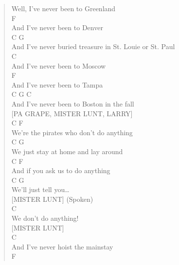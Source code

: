 \documentclass[11pt]{article}
\begin{document}
\begin{verse}
Well, I've never been to Greenland\\
\hspace*{9em}F\\
And I've never been to Denver\\
\hspace*{9em}C                        G\\
And I've never buried treasure in St. Louie or St. Paul\\
\hspace*{9em}C\\
And I've never been to Moscow\\
\hspace*{9em}F\\
And I've never been to Tampa\\
\hspace*{9em}C            G             C\\
And I've never been to Boston in the fall\\
\vspace*{1em}
\vspace*{1em}
[PA GRAPE, MISTER LUNT, LARRY]\\
C                              F\\
We're the pirates who don't do anything\\
\hspace*{8em}C                    G\\
We just stay at home and lay around\\
\hspace*{11em}C            F\\
And if you ask us to do anything\\
\hspace*{1em}C         G\\
We'll just tell you\ldots{}\\
\vspace*{1em}
\vspace*{1em}
[MISTER LUNT] (Spoken)\\
\hspace*{12em}C\\
We don't do anything!\\
\vspace*{1em}
\vspace*{1em}
[MISTER LUNT]\\
\hspace*{9em}C\\
And I've never hoist the mainstay\\
\hspace*{9em}F\\

\end{verse}
\end{document}
